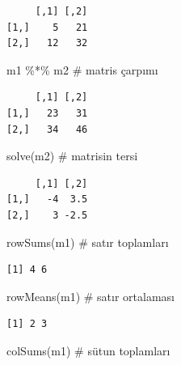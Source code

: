 \documentclass[
  letterpaper,
  DIV=11,
  numbers=noendperiod]{scrreprt}
\newenvironment{Shaded}{\begin{snugshade}}{\end{snugshade}}
\newcommand{\CommentTok}[1]{\textcolor[rgb]{0.37,0.37,0.37}{#1}}
\newcommand{\FunctionTok}[1]{\textcolor[rgb]{0.28,0.35,0.67}{#1}}
\newcommand{\NormalTok}[1]{\textcolor[rgb]{0.00,0.23,0.31}{#1}}
\newcommand{\SpecialCharTok}[1]{\textcolor[rgb]{0.37,0.37,0.37}{#1}}
\begin{document}
\begin{verbatim}
     [,1] [,2]
[1,]    5   21
[2,]   12   32
\end{verbatim}

\begin{Shaded}
\begin{Highlighting}[]
\NormalTok{m1 }\SpecialCharTok{\%*\%}\NormalTok{ m2 }\CommentTok{\# matris çarpımı}
\end{Highlighting}
\end{Shaded}

\begin{verbatim}
     [,1] [,2]
[1,]   23   31
[2,]   34   46
\end{verbatim}

\begin{Shaded}
\begin{Highlighting}[]
\FunctionTok{solve}\NormalTok{(m2) }\CommentTok{\# matrisin tersi}
\end{Highlighting}
\end{Shaded}

\begin{verbatim}
     [,1] [,2]
[1,]   -4  3.5
[2,]    3 -2.5
\end{verbatim}

\begin{Shaded}
\begin{Highlighting}[]
\FunctionTok{rowSums}\NormalTok{(m1) }\CommentTok{\# satır toplamları}
\end{Highlighting}
\end{Shaded}

\begin{verbatim}
[1] 4 6
\end{verbatim}

\begin{Shaded}
\begin{Highlighting}[]
\FunctionTok{rowMeans}\NormalTok{(m1) }\CommentTok{\# satır ortalaması}
\end{Highlighting}
\end{Shaded}

\begin{verbatim}
[1] 2 3
\end{verbatim}

\begin{Shaded}
\begin{Highlighting}[]
\FunctionTok{colSums}\NormalTok{(m1) }\CommentTok{\# sütun toplamları}
\end{Highlighting}
\end{Shaded}
\end{document}
